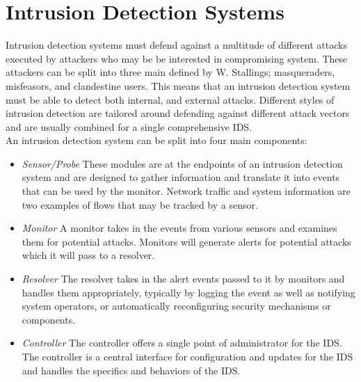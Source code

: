 \documentclass[12pt]{article} %
\begin{document}
\section{Intrusion Detection Systems}
Intrusion detection systems must defend against a multitude of different attacks executed by attackers who may be be interested in compromising system. These attackers can be split into three main defined by W. Stallings\cite{stallings08}; masqueraders, misfeasors, and clandestine users. This means that an intrusion detection system must be able to detect both internal, and external attacks. Different styles of intrusion detection are tailored around defending against different attack vectors and are usually combined for a single comprehensive IDS.\\
An intrusion detection system can be split into four main components\cite{verwoerd99}:
\begin{itemize}
    \item \textit{Sensor/Probe} These modules are at the endpoints of an intrusion detection system and are designed to gather information and translate it into events that can be used by the monitor. Network traffic and system information are two examples of flows that may be tracked by a sensor.\\
    \item \textit{Monitor} A monitor takes in the events from various sensors and examines them for potential attacks. Monitors will generate alerts for potential attacks which it will pass to a resolver.\\
    \item \textit{Resolver} The resolver takes in the alert events passed to it by monitors and handles them appropriately, typically by logging the event as well as notifying system operators, or automatically reconfiguring security mechanisms or components.\\
    \item \textit{Controller} The controller offers a single point of administrator for the IDS. The controller is a central interface for configuration and updates for the IDS and handles the specifics and behaviors of the IDS.\\
\end{itemize}
\end{document}
